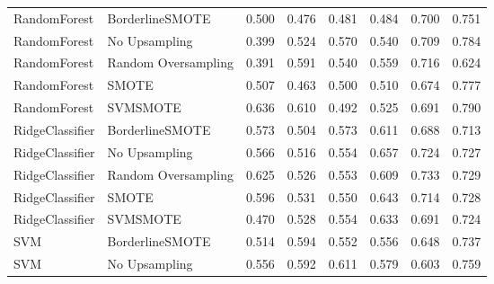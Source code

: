 \begin{tabular}{llllllll}
                RandomForest &     BorderlineSMOTE & 0.500 &                     0.476 &                 0.481 &                  0.484 &                                   0.700 &     0.751 \\
                RandomForest &       No Upsampling & 0.399 &                     0.524 &                 0.570 &                  0.540 &                                   0.709 &     0.784 \\
                RandomForest & Random Oversampling & 0.391 &                     0.591 &                 0.540 &                  0.559 &                                   0.716 &     0.624 \\
                RandomForest &               SMOTE & 0.507 &                     0.463 &                 0.500 &                  0.510 &                                   0.674 &     0.777 \\
                RandomForest &            SVMSMOTE & 0.636 &                     0.610 &                 0.492 &                  0.525 &                                   0.691 &     0.790 \\
             RidgeClassifier &     BorderlineSMOTE & 0.573 &                     0.504 &                 0.573 &                  0.611 &                                   0.688 &     0.713 \\
             RidgeClassifier &       No Upsampling & 0.566 &                     0.516 &                 0.554 &                  0.657 &                                   0.724 &     0.727 \\
             RidgeClassifier & Random Oversampling & 0.625 &                     0.526 &                 0.553 &                  0.609 &                                   0.733 &     0.729 \\
             RidgeClassifier &               SMOTE & 0.596 &                     0.531 &                 0.550 &                  0.643 &                                   0.714 &     0.728 \\
             RidgeClassifier &            SVMSMOTE & 0.470 &                     0.528 &                 0.554 &                  0.633 &                                   0.691 &     0.724 \\
                         SVM &     BorderlineSMOTE & 0.514 &                     0.594 &                 0.552 &                  0.556 &                                   0.648 &     0.737 \\
                         SVM &       No Upsampling & 0.556 &                     0.592 &                 0.611 &                  0.579 &                                   0.603 &     0.759 \\

\end{tabular}
